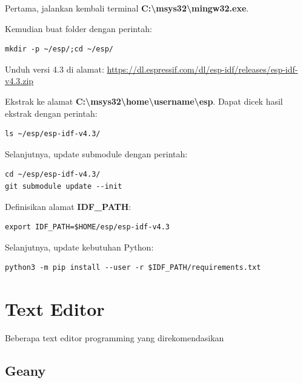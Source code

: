 \documentclass[12pt]{book}
\begin{document}
	Pertama, jalankan kembali terminal \textbf{C:\textbackslash msys32\textbackslash mingw32.exe}.
	
	Kemudian buat folder dengan perintah:
	
	\begin{verbatim}
mkdir -p ~/esp/;cd ~/esp/
	\end{verbatim}
	
	Unduh versi 4.3 di alamat: \url{https://dl.espressif.com/dl/esp-idf/releases/esp-idf-v4.3.zip}
	
	Ekstrak ke alamat \textbf{C:\textbackslash msys32\textbackslash home\textbackslash username\textbackslash esp}.
	Dapat dicek hasil ekstrak dengan perintah:
	
	\begin{verbatim}
ls ~/esp/esp-idf-v4.3/
	\end{verbatim}
	
	Selanjutnya, update submodule dengan perintah:
	
	\begin{verbatim}
cd ~/esp/esp-idf-v4.3/
git submodule update --init
	\end{verbatim}
	
	Definisikan alamat \textbf{IDF\_PATH}:
	
	\begin{verbatim}
export IDF_PATH=$HOME/esp/esp-idf-v4.3
	\end{verbatim}
	
	Selanjutnya, update kebutuhan Python:
	
	\begin{verbatim}
python3 -m pip install --user -r $IDF_PATH/requirements.txt
	\end{verbatim}
	
	
	\chapter{Text Editor}
	
	Beberapa text editor programming yang direkomendasikan
	
	\section{Geany}
	
\end{document}
